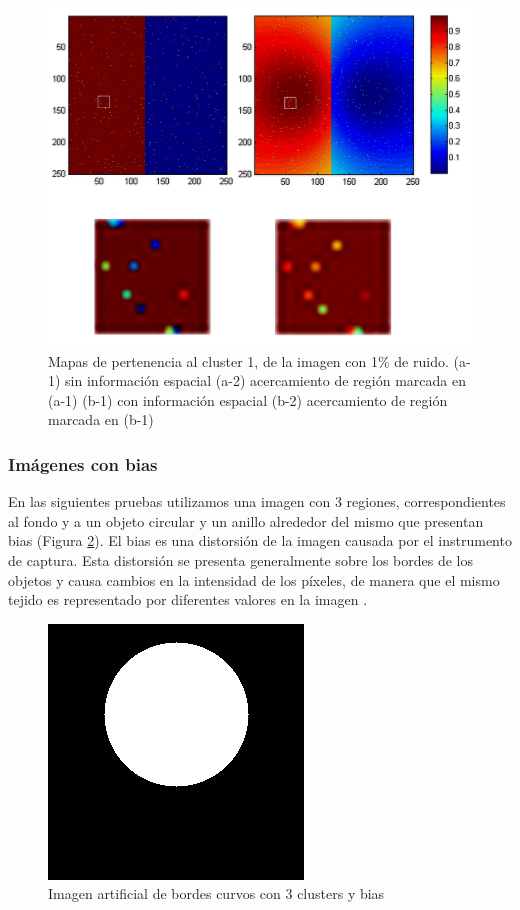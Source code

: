 \begin{figure}[H]
\centering
\includegraphics[scale=0.05]{images/mitad_mitad_ruido_zoom-fondo-blanco.jpg}
\caption{Mapas de pertenencia al cluster 1, de la imagen con 1\% de ruido. 
(a-1) sin información espacial (a-2) acercamiento de región marcada en (a-1)
(b-1) con información espacial (b-2) acercamiento de región marcada en (b-1)}
\label{fig:mitad_mitad_ruido_zoom}
\end{figure}

\subsubsection{Imágenes con bias}
En las siguientes pruebas utilizamos una imagen con 3 regiones, correspondientes al fondo y a un objeto circular y un anillo alrededor del mismo que presentan bias (Figura \ref{fig:circulo_bias}). El bias es una distorsión de la imagen causada por el instrumento de captura. Esta distorsión se presenta generalmente sobre los bordes de los objetos y causa cambios en la intensidad de los píxeles, de manera que el mismo tejido es representado por diferentes valores en la imagen \citep{juntu2005bias}.

\begin{figure}[H]
\centering
\includegraphics[scale=0.3]{images/biasing.png}
\caption{Imagen artificial de bordes curvos con 3 clusters y bias}
\label{fig:circulo_bias}
\end{figure}

